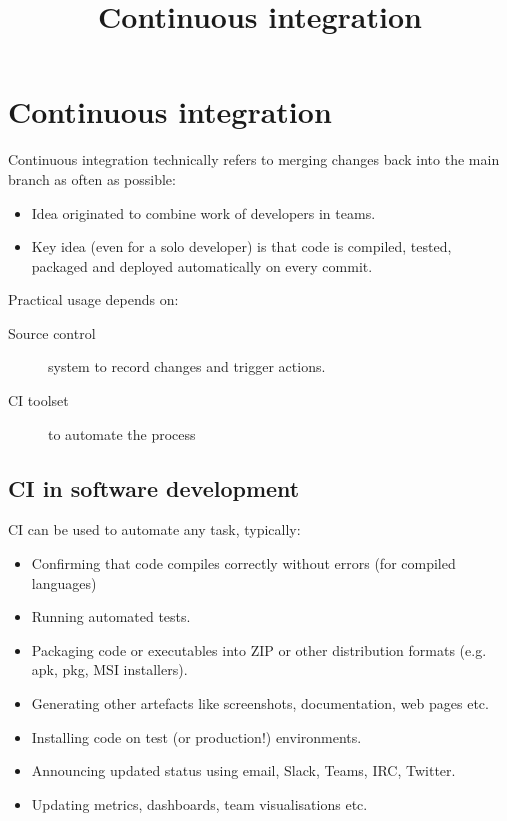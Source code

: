 \documentclass[slides]{pgnotes}
\title{Continuous integration}
\begin{document}
\maketitle

\tableofcontents

\section{Continuous integration}

Continuous integration technically refers to merging changes back into the main branch as often as possible:

\begin{itemize}
\item Idea originated to combine work of developers in teams.
\item Key idea (even for a solo developer) is that code is compiled, tested, packaged and deployed automatically on every commit.
\end{itemize}

Practical usage depends on:
\begin{description}
\item[Source control] system to record changes and trigger actions.
\item[CI toolset] to automate the process
\end{description}

\subsection{CI in software development}

CI can be used to automate any task, typically:

\begin{itemize}
\item Confirming that code compiles correctly without errors (for compiled languages)
\item Running automated tests.
\item Packaging code or executables into ZIP or other distribution formats (e.g. apk, pkg, MSI installers).
\item Generating other artefacts like screenshots, documentation, web pages etc.
\item Installing code on test (or production!) environments.
\item Announcing updated status using email, Slack, Teams, IRC, Twitter.
\item Updating metrics, dashboards, team visualisations etc. 
\end{itemize}
\end{document}
